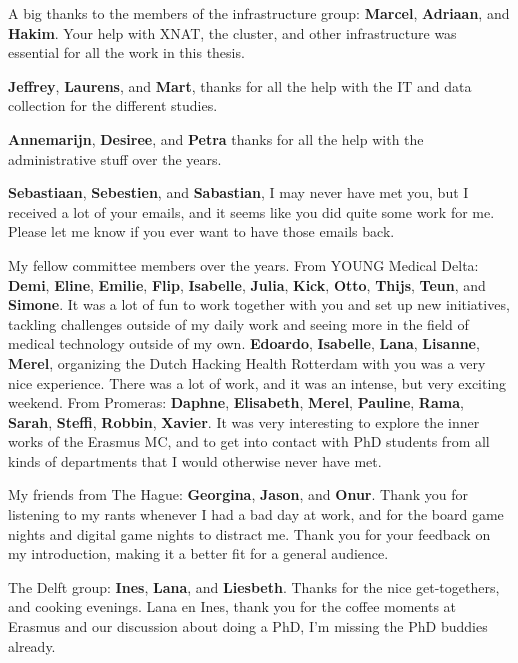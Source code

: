 A big thanks to the members of the infrastructure group: \textbf{Marcel}, \textbf{Adriaan}, and \textbf{Hakim}.
Your help with XNAT, the cluster, and other infrastructure was essential for all the work in this thesis.

\textbf{Jeffrey}, \textbf{Laurens}, and \textbf{Mart}, thanks for all the help with the IT and data collection for the different studies.

\textbf{Annemarijn}, \textbf{Desiree}, and \textbf{Petra} thanks for all the help with the administrative stuff over the years.

\textbf{Sebastiaan}, \textbf{Sebestien}, and \textbf{Sabastian}, I may never have met you, but I received a lot of your emails, and it seems like you did quite some work for me.
Please let me know if you ever want to have those emails back.


My fellow committee members over the years.
From YOUNG Medical Delta: \textbf{Demi}, \textbf{Eline}, \textbf{Emilie}, \textbf{Flip}, \textbf{Isabelle}, \textbf{Julia}, \textbf{Kick}, \textbf{Otto}, \textbf{Thijs}, \textbf{Teun}, and \textbf{Simone}.
It was a lot of fun to work together with you and set up new initiatives, tackling challenges outside of my daily work and seeing more in the field of medical technology outside of my own.
\textbf{Edoardo}, \textbf{Isabelle}, \textbf{Lana}, \textbf{Lisanne}, \textbf{Merel}, organizing the Dutch Hacking Health Rotterdam with you was a very nice experience.
There was a lot of work, and it was an intense, but very exciting weekend.
From Promeras: \textbf{Daphne}, \textbf{Elisabeth}, \textbf{Merel}, \textbf{Pauline}, \textbf{Rama}, \textbf{Sarah}, \textbf{Steffi}, \textbf{Robbin}, \textbf{Xavier}.
It was very interesting to explore the inner works of the Erasmus MC, and to get into contact with PhD students from all kinds of departments that I would otherwise never have met.


My friends from The Hague: \textbf{Georgina}, \textbf{Jason}, and \textbf{Onur}.
Thank you for listening to my rants whenever I had a bad day at work, and for the board game nights and digital game nights to distract me.
Thank you for your feedback on my introduction, making it a better fit for a general audience.

The Delft group: \textbf{Ines}, \textbf{Lana}, and \textbf{Liesbeth}.
Thanks for the nice get-togethers, and cooking evenings.
Lana en Ines, thank you for the coffee moments at Erasmus and our discussion about doing a PhD, I'm missing the PhD buddies already.

